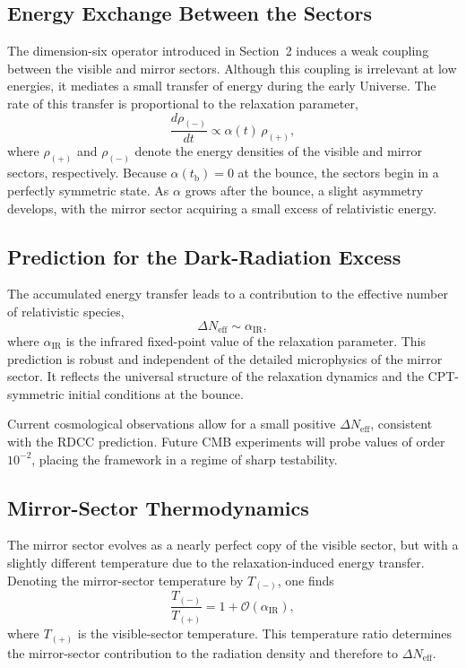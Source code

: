 \documentclass[11pt,a4paper]{article}
\begin{document}
\subsection{Energy Exchange Between the Sectors}

The dimension-six operator introduced in Section~2 induces a weak coupling between
the visible and mirror sectors. Although this coupling is irrelevant at low energies, it
mediates a small transfer of energy during the early Universe. The rate of this transfer
is proportional to the relaxation parameter,
\begin{equation}
    \frac{d\rho_{(-)}}{dt}
    \propto \alpha(t)\,\rho_{(+)} ,
\end{equation}
where $\rho_{(+)}$ and $\rho_{(-)}$ denote the energy densities of the visible and mirror
sectors, respectively. Because $\alpha(t_{\mathrm{b}})=0$ at the bounce, the sectors begin in a
perfectly symmetric state. As $\alpha$ grows after the bounce, a slight asymmetry
develops, with the mirror sector acquiring a small excess of relativistic energy.

\subsection{Prediction for the Dark-Radiation Excess}

The accumulated energy transfer leads to a contribution to the effective number of
relativistic species,
\begin{equation}
    \Delta N_{\mathrm{eff}} \sim \alpha_{\mathrm{IR}},
\end{equation}
where $\alpha_{\mathrm{IR}}$ is the infrared fixed-point value of the relaxation parameter.
This prediction is robust and independent of the detailed microphysics of the mirror
sector. It reflects the universal structure of the relaxation dynamics and the
CPT-symmetric initial conditions at the bounce.

Current cosmological observations allow for a small positive $\Delta N_{\mathrm{eff}}$,
consistent with the RDCC prediction. Future CMB experiments will probe values of
order $10^{-2}$, placing the framework in a regime of sharp testability.

\subsection{Mirror-Sector Thermodynamics}

The mirror sector evolves as a nearly perfect copy of the visible sector, but with a
slightly different temperature due to the relaxation-induced energy transfer. Denoting
the mirror-sector temperature by $T_{(-)}$, one finds
\begin{equation}
    \frac{T_{(-)}}{T_{(+)}} = 1 + \mathcal{O}(\alpha_{\mathrm{IR}}),
\end{equation}
where $T_{(+)}$ is the visible-sector temperature. This temperature ratio determines
the mirror-sector contribution to the radiation density and therefore to
$\Delta N_{\mathrm{eff}}$.
\end{document}
